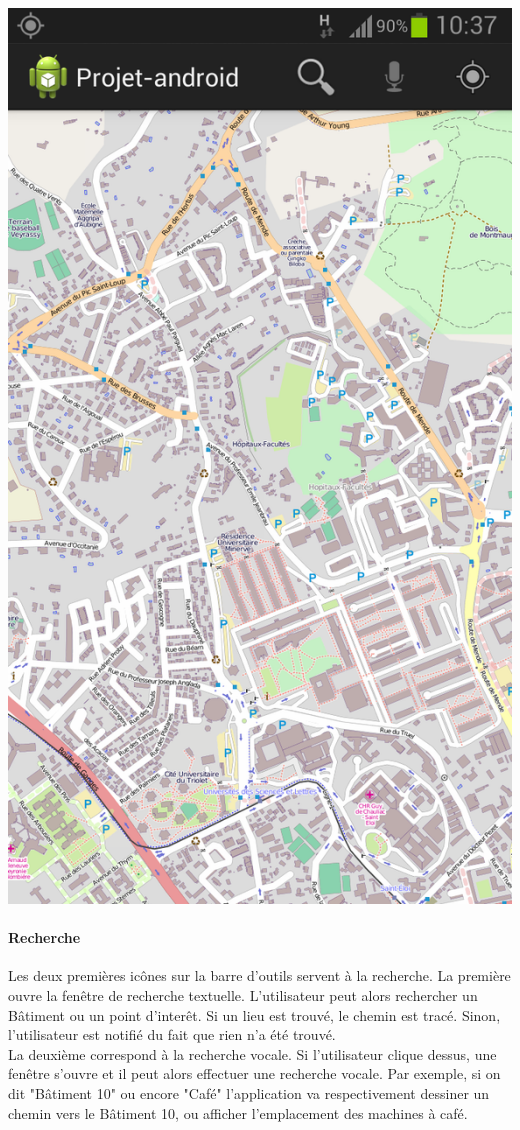 \documentclass{article}
\begin{document}
	\begin{center}
		\includegraphics[scale=0.25]{carte.png}
	\end{center}
	
	\paragraph{Recherche}
	Les deux premières icônes sur la barre d'outils servent à la recherche. La première ouvre la fenêtre de recherche textuelle. L'utilisateur peut alors rechercher un Bâtiment ou un point d'interêt. Si un lieu est trouvé, le chemin est tracé. Sinon, l'utilisateur est notifié du fait que rien n'a été trouvé. \\
	La deuxième correspond à la recherche vocale. Si l'utilisateur clique dessus, une fenêtre s'ouvre et il peut alors effectuer une recherche vocale. Par exemple, si on dit "Bâtiment 10" ou encore "Café" l'application va respectivement dessiner un chemin vers le Bâtiment 10, ou afficher l'emplacement des machines à café. \\
	
\end{document}
